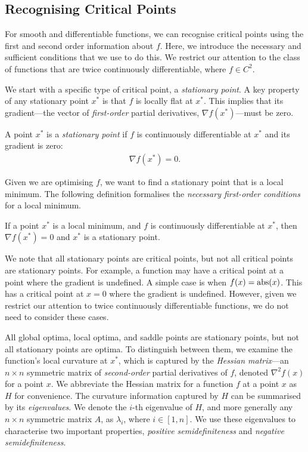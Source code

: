 \subsection{Recognising Critical Points}
\label{ssec:recognising_critical_points}

For smooth and differentiable functions, we can recognise critical points using the first and second order information about $f$. Here, we introduce the necessary and sufficient conditions that we use to do this. We restrict our attention to the class of functions that are twice continuously differentiable, where $f \in C^2$.

We start with a specific type of critical point, a \textit{stationary point}. A key property of any stationary point $x^*$ is that $f$ is locally flat at $x^*$. This implies that its gradient---the vector of \textit{first-order} partial derivatives, $\nabla f(x^*)$---must be zero.
\begin{definition}
    A point $x^*$ is a \textit{stationary point} if $f$ is continuously differentiable at $x^*$ and its gradient is zero:
    \begin{align}
        \nabla f(x^*) = 0.
    \end{align}
\end{definition}

Given we are optimising $f$, we want to find a stationary point that is a local minimum. The following definition formalises the \textit{necessary first-order conditions} for a local minimum.
\begin{definition}
    If a point $x^*$ is a local minimum, and $f$ is continuously differentiable at $x^*$, then $\nabla f(x^*) = 0$ and $x^*$ is a stationary point.
\end{definition}

We note that all stationary points are critical points, but not all critical points are stationary points. For example, a function may have a critical point at a point where the gradient is undefined. A simple case is when $f(x) = \operatorname{abs}({x})$. This has a critical point at $x = 0$ where the gradient is undefined. However, given we restrict our attention to twice continuously differentiable functions, we do not need to consider these cases. 

All global optima, local optima, and saddle points are stationary points, but not all stationary points are optima. To distinguish between them, we examine the function's local curvature at $x^*$, which is captured by the \textit{Hessian matrix}---an $n \times n$ symmetric matrix of \textit{second-order} partial derivatives of $f$, denoted $\nabla^2 f(x)$ for a point $x$. We abbreviate the Hessian matrix for a function $f$ at a point $x$ as $H$ for convenience. The curvature information captured by $H$ can be summarised by its \textit{eigenvalues}. We denote the $i$-th eigenvalue of $H$, and more generally any $n \times n$ symmetric matrix $A$, as $\lambda_i$, where $i \in [1, n]$. We use these eigenvalues to characterise two important properties, \textit{positive semidefiniteness} and \textit{negative semidefiniteness}.

